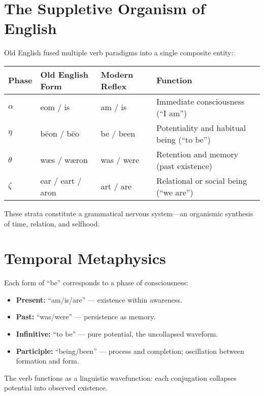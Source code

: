 \documentclass[12pt]{article}
\begin{document}
\section{The Suppletive Organism of English}

Old English fused multiple verb paradigms into a single composite entity:

\begin{center}
\begin{tabular}{llll}
\toprule
Phase & Old English Form & Modern Reflex & Function \\
\midrule
$\alpha$ & eom / is & am / is & Immediate consciousness (``I am'') \\
$\eta$ & b\=eon / b\=eo & be / been & Potentiality and habitual being (``to be'') \\
$\theta$ & w\ae s / w\ae ron & was / were & Retention and memory (past existence) \\
$\zeta$ & ear / eart / aron & art / are & Relational or social being (``we are'') \\
\bottomrule
\end{tabular}
\end{center}

These strata constitute a grammatical nervous system---an organismic synthesis of time, relation, and selfhood.

\section{Temporal Metaphysics}
Each form of ``be'' corresponds to a phase of consciousness:
\begin{itemize}
  \item \textbf{Present:} ``am/is/are'' — existence within awareness.
  \item \textbf{Past:} ``was/were'' — persistence as memory.
  \item \textbf{Infinitive:} ``to be'' — pure potential, the uncollapsed waveform.
  \item \textbf{Participle:} ``being/been'' — process and completion; oscillation between formation and form.
\end{itemize}

The verb functions as a linguistic wavefunction: each conjugation collapses potential into observed existence.
\end{document}
